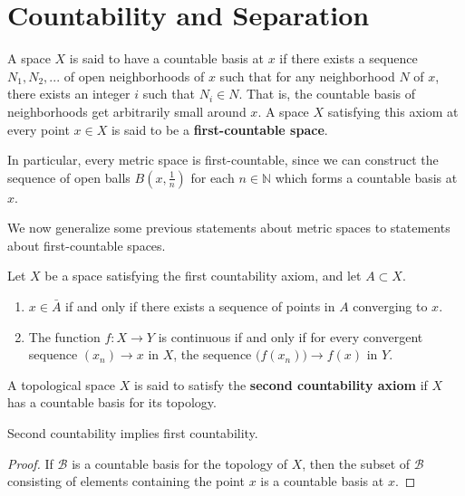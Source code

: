 \section{Countability and Separation}

    \begin{definition}
    A space $X$ is said to have a countable basis at $x$ if there exists a sequence $N_1, N_2, ...$ of open neighborhoods of $x$ such that for any neighborhood $N$ of $x$, there exists an integer $i$ such that $N_i \in N$. That is, the countable basis of neighborhoods get arbitrarily small around $x$. A space $X$ satisfying this axiom at every point $x \in X$ is said to be a \textbf{first-countable space}. 
    \end{definition}

    In particular, every metric space is first-countable, since we can construct the sequence of open balls $B (x, \frac{1}{n})$ for each $n \in \mathbb{N}$ which forms a countable basis at $x$. 

    We now generalize some previous statements about metric spaces to statements about first-countable spaces. 

    \begin{theorem}
    Let $X$ be a space satisfying the first countability axiom, and let $A \subset X$. 
    \begin{enumerate}
        \item $x \in \bar{A}$ if and only if there exists a sequence of points in $A$ converging to $x$. 
        \item The function $f: X \longrightarrow Y$ is continuous if and only if for every convergent sequence $(x_n) \rightarrow x$ in $X$, the sequence $\big( f(x_n)\big) \rightarrow f(x)$ in $Y$. 
    \end{enumerate}
    \end{theorem}

    \begin{definition}
    A topological space $X$ is said to satisfy the \textbf{second countability axiom} if $X$ has a countable basis for its topology.
    \end{definition}

    \begin{proposition}
    Second countability implies first countability. 
    \end{proposition}
    \begin{proof}
    If $\mathscr{B}$ is a countable basis for the topology of $X$, then the subset of $\mathscr{B}$ consisting of elements containing the point $x$ is a countable basis at $x$. 
    \end{proof}

